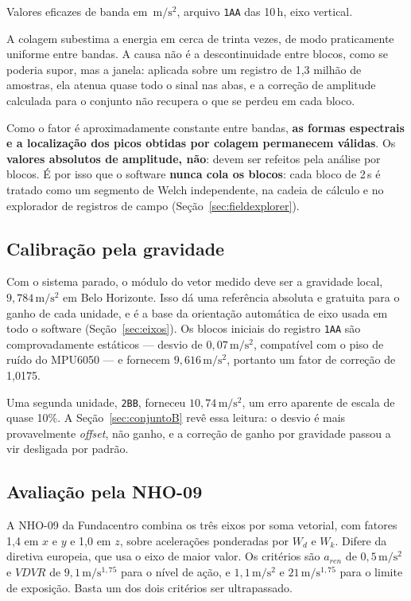 \documentclass[11pt,a4paper]{article}
\newcommand{\code}[1]{\texttt{\small #1}}
\newcommand{\unit}[2]{\ensuremath{#1\,\mathrm{#2}}}
\begin{document}
\noindent
Valores eficazes de banda em \unit{}{m/s^2}, arquivo \code{1AA} das 10\,h, eixo
vertical.

A colagem subestima a energia em cerca de trinta vezes, de modo praticamente
uniforme entre bandas. A causa não é a descontinuidade entre blocos, como se
poderia supor, mas a janela: aplicada sobre um registro de 1,3 milhão de
amostras, ela atenua quase todo o sinal nas abas, e a correção de amplitude
calculada para o conjunto não recupera o que se perdeu em cada bloco.

Como o fator é aproximadamente constante entre bandas, \textbf{as formas
espectrais e a localização dos picos obtidas por colagem permanecem válidas}.
Os \textbf{valores absolutos de amplitude, não}: devem ser refeitos pela análise
por blocos. É por isso que o software \textbf{nunca cola os blocos}: cada bloco
de 2\,s é tratado como um segmento de Welch independente, na cadeia de cálculo e
no explorador de registros de campo (Seção~\ref{sec:fieldexplorer}).

\subsection{Calibração pela gravidade}

Com o sistema parado, o módulo do vetor medido deve ser a gravidade local,
\unit{9{,}784}{m/s^2} em Belo Horizonte. Isso dá uma referência absoluta e
gratuita para o ganho de cada unidade, e é a base da orientação automática de
eixo usada em todo o software (Seção~\ref{sec:eixos}). Os blocos iniciais do
registro \code{1AA} são comprovadamente estáticos --- desvio de
\unit{0{,}07}{m/s^2}, compatível com o piso de ruído do MPU6050 --- e fornecem
\unit{9{,}616}{m/s^2}, portanto um fator de correção de 1,0175.

Uma segunda unidade, \code{2BB}, forneceu \unit{10{,}74}{m/s^2}, um erro
aparente de escala de quase 10\%. A Seção~\ref{sec:conjuntoB} revê essa leitura:
o desvio é mais provavelmente \emph{offset}, não ganho, e a correção de ganho
por gravidade passou a vir desligada por padrão.

\subsection{Avaliação pela NHO-09}

A NHO-09 da Fundacentro combina os três eixos por soma vetorial, com fatores
1,4 em $x$ e $y$ e 1,0 em $z$, sobre acelerações ponderadas por $W_d$ e $W_k$.
Difere da diretiva europeia, que usa o eixo de maior valor. Os critérios são
$a_{ren}$ de \unit{0{,}5}{m/s^2} e $VDVR$ de \unit{9{,}1}{m/s^{1{,}75}} para
o nível de ação, e \unit{1{,}1}{m/s^2} e \unit{21}{m/s^{1{,}75}} para o limite
de exposição. Basta um dos dois critérios ser ultrapassado.
\end{document}
